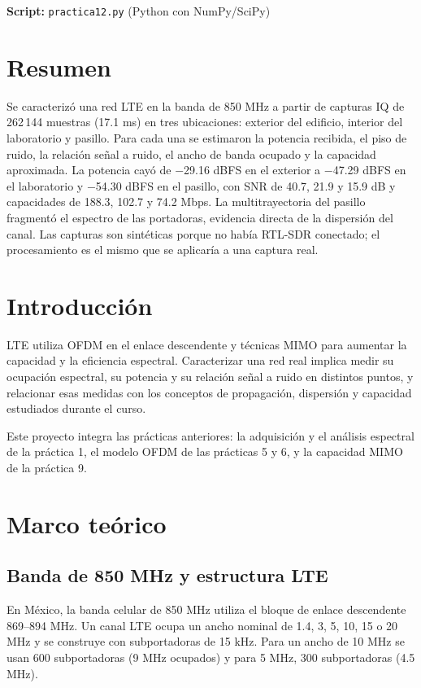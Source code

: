 \documentclass[11pt,a4paper]{article}
\begin{document}

\textbf{Script:} \texttt{practica12.py} (Python con NumPy/SciPy)

\section{Resumen}

Se caracterizó una red LTE en la banda de 850 MHz a partir de capturas IQ de 262\,144
muestras (17.1 ms) en tres ubicaciones: exterior del edificio, interior del laboratorio y
pasillo. Para cada una se estimaron la potencia recibida, el piso de ruido, la relación
señal a ruido, el ancho de banda ocupado y la capacidad aproximada. La potencia cayó de
$-$29.16 dBFS en el exterior a $-$47.29 dBFS en el laboratorio y $-$54.30 dBFS en el
pasillo, con SNR de 40.7, 21.9 y 15.9 dB y capacidades de 188.3, 102.7 y 74.2 Mbps. La
multitrayectoria del pasillo fragmentó el espectro de las portadoras, evidencia directa de
la dispersión del canal. Las capturas son sintéticas porque no había RTL-SDR conectado; el
procesamiento es el mismo que se aplicaría a una captura real.

\section{Introducción}

LTE utiliza OFDM en el enlace descendente y técnicas MIMO para aumentar la capacidad y la
eficiencia espectral. Caracterizar una red real implica medir su ocupación espectral, su
potencia y su relación señal a ruido en distintos puntos, y relacionar esas medidas con los
conceptos de propagación, dispersión y capacidad estudiados durante el curso.

Este proyecto integra las prácticas anteriores: la adquisición y el análisis espectral de
la práctica 1, el modelo OFDM de las prácticas 5 y 6, y la capacidad MIMO de la práctica 9.

\section{Marco teórico}

\subsection{Banda de 850 MHz y estructura LTE}

En México, la banda celular de 850 MHz utiliza el bloque de enlace descendente
869--894 MHz. Un canal LTE ocupa un ancho nominal de 1.4, 3, 5, 10, 15 o 20 MHz y se
construye con subportadoras de 15 kHz. Para un ancho de 10 MHz se usan 600 subportadoras
(9 MHz ocupados) y para 5 MHz, 300 subportadoras (4.5 MHz).
\end{document}
